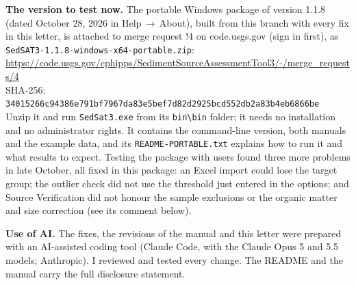 \documentclass[11pt]{article}
\newcommand{\code}[1]{\texttt{#1}}
\begin{document}
\textbf{The version to test now.} The portable Windows package of version
1.1.8 (dated October 28, 2026 in Help\,$\rightarrow$\,About), built from this
branch with every fix in this letter, is attached to merge request !4 on
code.usgs.gov (sign in first), as
\code{SedSAT3-1.1.8-windows-x64-portable.\allowbreak{}zip}:\\
\url{https://code.usgs.gov/cphipps/SedimentSourceAssessmentTool3/-/merge_requests/4}\\
SHA-256: \code{34015266c94386e791bf7967da83e5bef7d82d2925bcd552db2a83b4eb6866be}\\
Unzip it and run \code{SedSat3.exe} from its \code{bin\textbackslash bin} folder;
it needs no installation and no administrator rights. It contains the
command-line version, both manuals and the example data, and its
\code{README-PORTABLE.txt} explains how to run it and what results to expect.
Testing the package with users found three more problems in late October,
all fixed in this package: an Excel import could lose the target group;
the outlier check did not use the threshold just entered in the options; and
Source Verification did not honour the sample exclusions or the organic matter
and size correction (see its comment below).

\textbf{Use of AI.} The fixes, the revisions of the manual and this letter were
prepared with an AI-assisted coding tool (Claude Code, with the Claude Opus 5
and 5.5 models; Anthropic). I reviewed and tested every change. The README and
the manual carry the full disclosure statement.
\end{document}
